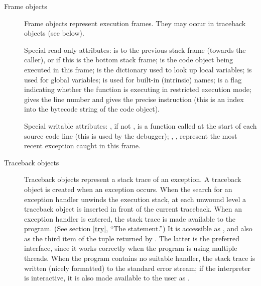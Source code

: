 \begin{description}
\begin{description}
\item[Frame objects]
Frame objects represent execution frames.  They may occur in traceback
objects (see below).

Special read-only attributes:  is to the previous
stack frame (towards the caller), or  if this is the bottom
stack frame;  is the code object being executed in this
frame;  is the dictionary used to look up local
variables;  is used for global variables;
 is used for built-in (intrinsic) names;
 is a flag indicating whether the function is
executing in restricted execution mode;
 gives the line number and  gives the
precise instruction (this is an index into the bytecode string of
the code object).

Special writable attributes: , if not , is a
function called at the start of each source code line (this is used by
the debugger); , ,
 represent the most recent exception caught in
this frame.

\item[Traceback objects] \label{traceback}
Traceback objects represent a stack trace of an exception.  A
traceback object is created when an exception occurs.  When the search
for an exception handler unwinds the execution stack, at each unwound
level a traceback object is inserted in front of the current
traceback.  When an exception handler is entered, the stack trace is
made available to the program.
(See section \ref{try}, ``The  statement.'')
It is accessible as , and also as the third
item of the tuple returned by .  The latter is
the preferred interface, since it works correctly when the program is
using multiple threads.
When the program contains no suitable handler, the stack trace is written
(nicely formatted) to the standard error stream; if the interpreter is
interactive, it is also made available to the user as
.


\end{description}
\end{description}

